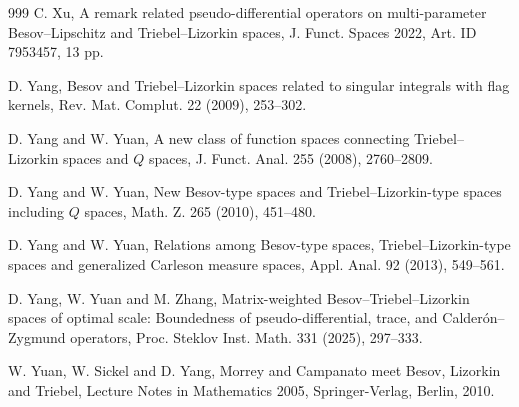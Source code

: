 \documentclass[11pt, reqno]{amsart}
\theoremstyle{definition}
\theoremstyle{remark}
\numberwithin{equation}{section}
\begin{document}
\begin{thebibliography}{999}
C. Xu,
A remark related pseudo-differential operators on
multi-parameter Besov--Lipschitz and Triebel--Lizorkin spaces,
J. Funct. Spaces 2022, Art. ID 7953457, 13 pp.

D. Yang,
Besov and Triebel--Lizorkin spaces related to singular integrals with flag kernels,
Rev. Mat. Complut. 22 (2009), 253--302.

D. Yang and W. Yuan,
A new class of function spaces connecting
Triebel--Lizorkin spaces and $Q$ spaces,
J. Funct. Anal. 255 (2008), 2760--2809.

D. Yang and W. Yuan,
New Besov-type spaces and Triebel--Lizorkin-type spaces including $Q$ spaces,
Math. Z. 265 (2010), 451--480.

D. Yang and W. Yuan,
Relations among Besov-type spaces, Triebel--Lizorkin-type spaces
and generalized Carleson measure spaces,
Appl. Anal. 92 (2013), 549--561.

D. Yang, W. Yuan and M. Zhang,
Matrix-weighted Besov--Triebel--Lizorkin spaces of optimal scale:
Boundedness of pseudo-differential, trace, and Calder\'on--Zygmund operators,
Proc. Steklov Inst. Math. 331 (2025), 297--333.

W. Yuan, W. Sickel and D. Yang,
Morrey and Campanato meet Besov, Lizorkin and Triebel,
Lecture Notes in Mathematics 2005,
Springer-Verlag, Berlin, 2010.


\end{thebibliography}
\end{document}
